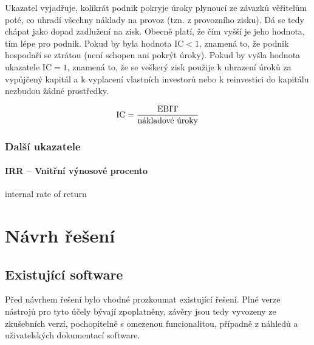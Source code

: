 Ukazatel vyjadřuje, kolikrát podnik pokryje úroky plynoucí ze závazků věřitelům poté, co uhradí všechny náklady na provoz (tzn. z provozního zisku). Dá se tedy chápat jako dopad zadlužení na zisk. Obecně platí, že čím vyšší je jeho hodnota, tím lépe pro podnik. Pokud by byla hodnota IC$<1$, znamená to, že podnik hospodaří se ztrátou (není schopen ani pokrýt úroky). Pokud by vyšla hodnota ukazatele IC$=1$, znamená to, že se veškerý zisk použije k uhrazení úroků za vypůjčený kapitál a k vyplacení vlastních investorů nebo k reinvestici do kapitálu nezbudou žádné prostředky.

$$\text{IC} = \dfrac{\text{EBIT}}{\text{nákladové úroky}}$$








\subsection{Další ukazatele}

\subsubsection{IRR -- Vnitřní výnosové procento}
internal rate of return







































\chapter{Návrh řešení}



\section{Existující software}
Před návrhem řešení bylo vhodné prozkoumat existující řešení. Plné verze nástrojů pro tyto účely bývají zpoplatněny, závěry jsou tedy vyvozeny ze zkušebních verzí, pochopitelně s omezenou funcionalitou, případně z náhledů a uživatelských dokumentací software.

